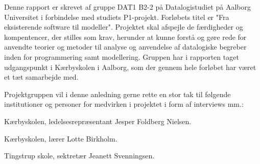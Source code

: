 Denne rapport er skrevet af gruppe DAT1 B2-2 på Datalogistudiet på Aalborg Universitet i forbindelse med studiets P1-projekt. Forløbets titel er "Fra eksisterende software til modeller". Projektet skal afspejle de færdigheder og kompentencer, der stilles som krav, herunder at kunne forstå og gøre rede for anvendte teorier og metoder til analyse og anvendelse af datalogiske begreber inden for programmering samt modellering. Gruppen har i rapporten taget udgangspunkt i Kærbyskolen i Aalborg, som der gennem hele forløbet har været et tæt samarbejde med.

Projektgruppen vil i denne anledning gerne rette en stor tak til følgende institutioner og personer for medvirken i projektet i form af interviews mm.:

Kærbyskolen, ledelsesrepræsentant Jesper Foldberg Nielsen.

Kærbyskolen, lærer Lotte Birkholm.

Tingstrup skole, sektretær Jeanett Svenningsen.